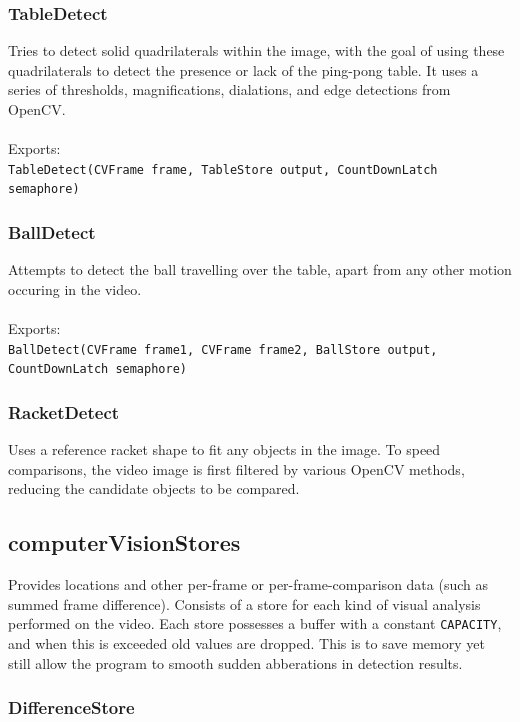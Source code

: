 \documentclass[11pt]{report}
\begin{document}
\subsubsection{TableDetect}

Tries to detect solid quadrilaterals within the image, with the goal of using these quadrilaterals to detect the presence or lack of the ping-pong table.  It uses a series of thresholds, magnifications, dialations, and edge detections from OpenCV.\\
\\
Exports:\\
\texttt{TableDetect(CVFrame frame, TableStore output, CountDownLatch semaphore)}

\subsubsection{BallDetect}

Attempts to detect the ball travelling over the table, apart from any other motion occuring in the video.\\
\\
Exports:\\
\texttt{BallDetect(CVFrame frame1, CVFrame frame2, BallStore output, CountDownLatch semaphore)}

\subsubsection{RacketDetect}

Uses a reference racket shape to fit any objects in the image.  To speed comparisons, the video image is first filtered by various OpenCV methods, reducing the candidate objects to be compared.

\subsection{computerVisionStores}

Provides locations and other per-frame or per-frame-comparison data (such as summed frame difference).  Consists of a store for each kind of visual analysis performed on the video.  Each store possesses a buffer with a constant \texttt{CAPACITY}, and when this is exceeded old values are dropped.  This is to save memory yet still allow the program to smooth sudden abberations in detection results.

\subsubsection{DifferenceStore}
\end{document}
